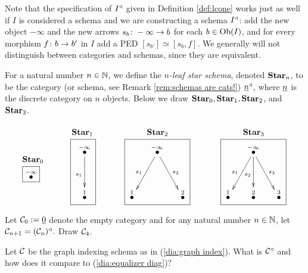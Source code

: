 \begin{remark}\label{rem:schemas are cats!}

Note that the specification of $I^\triangleleft$ given in Definition \ref{def:lcone} works just as well if $I$ is considered a schema and we are constructing a schema $I^\triangleleft$: add the new object $-\infty$ and the new arrows $s_b\colon-\infty\rightarrow b$ for each $b\in\textnormal{Ob}(I)$, and for every morphism $f\colon b\rightarrow b'$ in $I$ add a PED $[s_{b'}]\simeq[s_b,f]$. We generally will not distinguish between categories and schemas, since they are equivalent.

\end{remark}

\begin{example}\label{ex:stars}

For a natural number $n\in{\mathbb N}$, we define the {\em $n$-leaf star schema}, denoted ${\bf Star}_n$, to be the category (or schema, see Remark \ref{rem:schemas are cats!}) $\underline{n}^\triangleleft$, where $\underline{n}$ is the discrete category on $n$ objects. Below we draw ${\bf Star}_0, {\bf Star}_1, {\bf Star}_2$, and ${\bf Star}_3$.
$$
\parbox{.3in}{\boxtitle{$\Star_0$}\fbox{$\LMO{-\infty}$}}
\hspace{.5in}
\parbox{.4in}{\boxtitle{$\Star_1$}\fbox{\xymatrix@=15pt{\LMO{-\infty}\ar[dd]_{s_1}\\\\\LMO{1}}}}
\hspace{.5in}
\parbox{1.1in}{\boxtitle{$\Star_2$}\fbox{\xymatrix@=15pt{&\LMO{-\infty}\ar[ddl]_{s_1}\ar[ddr]^{s_2}\\\\\LMO{1}&&\LMO{2}}}}
\hspace{.5in}
\parbox{1.1in}{\boxtitle{$\Star_3$}\fbox{\xymatrix@=15pt{&\LMO{-\infty}\ar[ddl]_{s_1}\ar[dd]_{s_2}\ar[ddr]^{s_3}\\\\\LMO{1}&\LMO{2}&\LMO{3}}}}
$$

\end{example}

\begin{exercise}
Let $\mathcal{C}_0:=\underline{0}$ denote the empty category and for any natural number $n\in{\mathbb N}$, let $\mathcal{C}_{n+1}=(\mathcal{C}_n)^\triangleleft.$ Draw $\mathcal{C}_4$.  
\end{exercise}

\begin{exercise}
Let $\mathcal{C}$ be the graph indexing schema as in (\ref{dia:graph index}). What is $\mathcal{C}^\triangleleft$ and how does it compare to (\ref{dia:equalizer diag})? 
\end{exercise}

